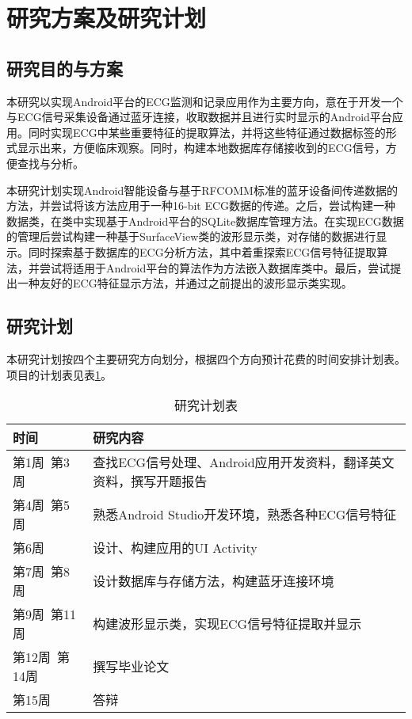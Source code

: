 \section{研究方案及研究计划}
\subsection{研究目的与方案}

本研究以实现Android平台的ECG监测和记录应用作为主要方向，意在于开发一个与ECG信号采集设备通过蓝牙连接，收取数据并且进行实时显示的Android平台应用。同时实现ECG中某些重要特征的提取算法，并将这些特征通过数据标签的形式显示出来，方便临床观察。同时，构建本地数据库存储接收到的ECG信号，方便查找与分析。

本研究计划实现Android智能设备与基于RFCOMM标准的蓝牙设备间传递数据的方法，并尝试将该方法应用于一种16-bit ECG数据的传递。之后，尝试构建一种数据类，在类中实现基于Android平台的SQLite数据库管理方法。在实现ECG数据的管理后尝试构建一种基于SurfaceView类的波形显示类，对存储的数据进行显示。同时探索基于数据库的ECG分析方法，其中着重探索ECG信号特征提取算法，并尝试将适用于Android平台的算法作为方法嵌入数据库类中。最后，尝试提出一种友好的ECG特征显示方法，并通过之前提出的波形显示类实现。

\subsection{研究计划}

本研究计划按四个主要研究方向划分，根据四个方向预计花费的时间安排计划表。项目的计划表见表\ref{tab1}。
\newpage

\begin{table}
\caption{\label{tab1}研究计划表}
\centering
\begin{tabular}{|p{}|p{}|}
\hline 
时间 & 研究内容 \\ 
\hline 
第1周~第3周 & 查找ECG信号处理、Android应用开发资料，翻译英文资料，撰写开题报告 \\ 
\hline 
第4周~第5周 & 熟悉Android Studio开发环境，熟悉各种ECG信号特征 \\ 
\hline 
第6周 & 设计、构建应用的UI Activity \\ 
\hline 
第7周~第8周 & 设计数据库与存储方法，构建蓝牙连接环境 \\ 
\hline 
第9周~第11周 & 构建波形显示类，实现ECG信号特征提取并显示 \\ 
\hline 
第12周~第14周 & 撰写毕业论文 \\ 
\hline 
第15周 & 答辩 \\ 
\hline 
\end{tabular} 

\end{table}